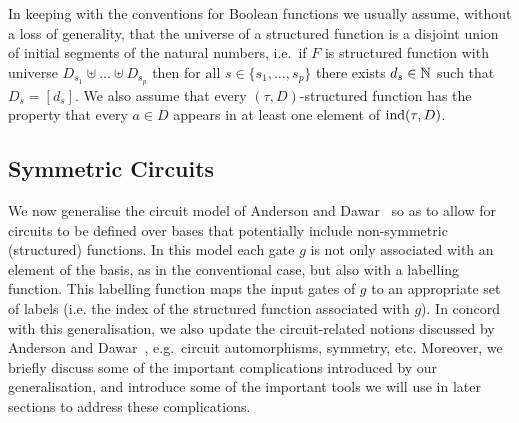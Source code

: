 \documentclass[../main/thesis.tex]{subfiles}
\begin{document}
In keeping with the conventions for Boolean functions we usually assume, without
a loss of generality, that the universe of a structured function is a disjoint
union of initial segments of the natural numbers, i.e.\ if $F$ is structured
function with universe $D_{s_1} \uplus \ldots \uplus D_{s_p}$ then for all $s
\in \{s_1 , \ldots , s_p\}$ there exists $d_s \in \mathbb{N}$ such that $D_{s} =
[d_s]$. We also assume that every $(\tau, D)$-structured function has the
property that every $a \in D$ appears in at least one element of $\text{\upshape ind}(\tau,
D)$.

\subsection{Symmetric Circuits}
We now generalise the circuit model of Anderson and Dawar~\cite{AndersonD17} so
as to allow for circuits to be defined over bases that potentially include
non-symmetric (structured) functions. In this model each gate $g$ is not only
associated with an element of the basis, as in the conventional case, but also
with a labelling function. This labelling function maps the input gates of $g$
to an appropriate set of labels (i.e. the index of the structured function
associated with $g$). In concord with this generalisation, we also update the
circuit-related notions discussed by Anderson and Dawar~\cite{AndersonD17},
e.g.\ circuit automorphisms, symmetry, etc. Moreover, we briefly discuss some of
the important complications introduced by our generalisation, and introduce some
of the important tools we will use in later sections to address these
complications.
\end{document}
